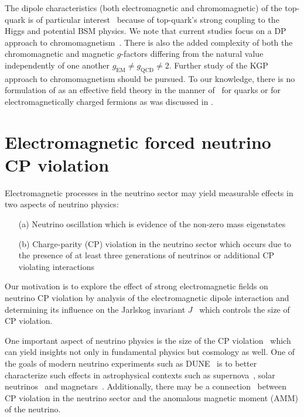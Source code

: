 The dipole characteristics (both electromagnetic and chromomagnetic) of the top-quark is of particular interest~\citep{Labun:2012fg,Vryonidou:2018eyv} because of top-quark's strong coupling to the Higgs and potential BSM physics. We note that current studies focus on a DP approach to chromomagnetism~\citep{Zhang:2010dr,Zhang:2012muc,BuarqueFranzosi:2015jrv}. There is also the added complexity of both the chromomagnetic and magnetic $g$-factors differing from the natural value independently of one another $g_\mathrm{EM}\neq g_\mathrm{QCD}\neq2$. Further study of the KGP approach to chromomagnetism should be pursued. To our knowledge, there is no formulation of  as an effective field theory in the manner of~\cite{Fleming:2000ib,Bauer:2000yr} for quarks or for electromagnetically charged fermions as was discussed in .


\section{Electromagnetic forced neutrino CP violation}
\label{sec:nucp}
Electromagnetic processes in the neutrino sector may yield measurable effects in two aspects of neutrino physics: 
\begin{itemize}
    \item[(a)] Neutrino oscillation which is evidence of the non-zero mass eigenstates
    \item[(b)] Charge-parity (CP) violation in the neutrino sector which occurs due to the presence of at least three generations of neutrinos or additional CP violating interactions
\end{itemize}

Our motivation is to explore the effect of strong electromagnetic fields on neutrino CP violation by analysis of the electromagnetic dipole interaction and determining its influence on the Jarlskog invariant $J$~\citep{Jarlskog:1985ht,Jarlskog:1985cw,Jarlskog:2004be} which controls the size of CP violation.

One important aspect of neutrino physics is the size of the CP violation~\citep{Xing:2000ik,giunti2007fundamentals,Huber:2022lpm} which can yield insights not only in fundamental physics but cosmology as well. One of the goals of modern neutrino experiments such as DUNE~\cite{DUNE:2020jqi} is to better characterize such effects in astrophysical contexts such as supernova~\citep{DUNE:2020zfm,SajjadAthar:2021prg}, solar neutrinos~\citep{Akhmedov:2022txm} and magnetars~\citep{Lichkunov:2020zzx}. Additionally, there may be a connection~\citep{Pehlivan:2014zua,Balaji:2019fxd,Balaji:2020oig} between CP violation in the neutrino sector and the anomalous magnetic moment (AMM) of the neutrino.

